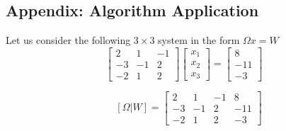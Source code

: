 \documentclass[../../../main.tex]{subfiles}
\begin{document}
\subsection{Appendix: Algorithm Application}
Let us consider the following $3 \times 3$ system in the form $\Omega x=W$
\begin{equation*}
    \begin{bmatrix}
        2  & 1  & -1 \\
        -3 & -1 & 2  \\
        -2 & 1  & 2
    \end{bmatrix}
    \begin{bmatrix}
        x_1 \\ x_2 \\ x_3
    \end{bmatrix}
    =
    \begin{bmatrix}
        8 \\ -11 \\ -3
    \end{bmatrix}
\end{equation*}

\begin{equation*}
    \quad
    [\Omega|W] =
    \begin{bmatrix}
        2  & 1  & -1 & 8   \\
        -3 & -1 & 2  & -11 \\
        -2 & 1  & 2  & -3
    \end{bmatrix}
\end{equation*}
\end{document}
